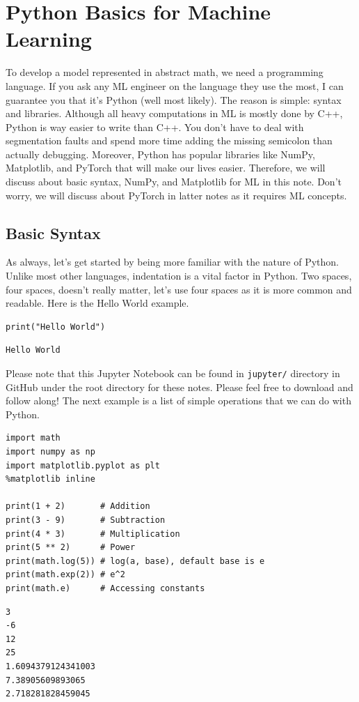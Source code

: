 \documentclass[../../main.tex]{subfiles}
\begin{document}
\chapter{Python Basics for Machine Learning}

To develop a model represented in abstract math, we need a
programming language. If you ask any ML engineer on the
language they use the most, I can guarantee you that it's
Python (well most likely). The reason is simple: syntax and
libraries. Although all heavy computations in ML is mostly done
by C++, Python is way easier to write than C++. You don't have to
deal with segmentation faults and spend more time adding the
missing semicolon than actually debugging. Moreover, Python has
popular libraries like NumPy, Matplotlib, and PyTorch that will
make our lives easier. Therefore, we will discuss about basic
syntax, NumPy, and Matplotlib for ML in this note. Don't worry,
we will discuss about PyTorch in latter notes as it requires
ML concepts.

\section{Basic Syntax}

As always, let's get started by being more familiar with the
nature of Python. Unlike most other languages, indentation is a
vital factor in Python. Two spaces, four spaces, doesn't really
matter, let's use four spaces as it is more common and readable.
Here is the Hello World example.

\begin{jupyter}
\begin{lstlisting}[style=jin]
print("Hello World")
\end{lstlisting}

\begin{lstlisting}[style=jout]
Hello World
\end{lstlisting}
\end{jupyter}

Please note that this Jupyter Notebook can be found in
\verb|jupyter/| directory in GitHub under the root directory for
these notes. Please feel free to download and follow along!
The next example is a list of simple operations that we can
do with Python.

\begin{jupyter}
\begin{lstlisting}[style=jin]
import math
import numpy as np
import matplotlib.pyplot as plt
%matplotlib inline

print(1 + 2)       # Addition
print(3 - 9)       # Subtraction
print(4 * 3)       # Multiplication
print(5 ** 2)      # Power
print(math.log(5)) # log(a, base), default base is e
print(math.exp(2)) # e^2
print(math.e)      # Accessing constants
\end{lstlisting}

\begin{lstlisting}[style=jout]
3
-6
12
25
1.6094379124341003
7.38905609893065
2.718281828459045
\end{lstlisting}
\end{jupyter}
\end{document}
